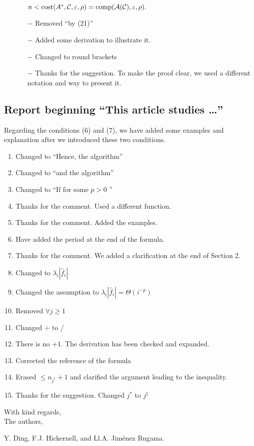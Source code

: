 \documentclass[letter]{article}
\begin{document}
\begin{enumerate}[labelwidth = 10ex]
\begin{itemize}
      $n < \textup{cost}(A^*,{\mathcal{C}},\varepsilon,\rho) =  \textup{comp}({\mathcal{A}}({\mathcal{C}}),\varepsilon,\rho).$ 
           \item[$-$] Removed ``by (21)''
           \item[$-$] Added some derivation to illustrate it.
            \item[$-$] Changed to round brackets
            \item[$-$] Thanks for the suggestion. To make the proof clear, we used a different notation and way to present it.
       \end{itemize}
\end{enumerate}

\subsection*{Report beginning  ``This article studies \ldots''}

Regarding the conditions (6) and (7), we have added some examples and explanation after we introduced these two conditions.

\begin{enumerate}
    \item Changed to ``Hence, the algorithm''
    \item Changed to ``and the algorithm''
    \item Changed to ``If for some $p > 0$ ''
    \item Thanks for the comment. Used a different function.
    \item Thanks for the comment. Added the examples.
    \item Have added the period at the end of the formula.
    \item Thanks for the comment. We added a clarification at the end of Section 2.
    \item Changed to $\lambda_i |\widehat{f}_i|$
    \item Changed the assumption to 
    $\lambda_i |\widehat{f}_i| =\Theta(i^{-p})$
    \item Removed $\forall j  \ge 1$
    \item Changed $\div$ to $/$
    \item There is no $+1$.  The derivation has been checked and expanded.
    \item Corrected the reference of the formula
    \item Erased $\le n_{j^\dagger}+1$ and clarified the argument leading to the inequality.
    \item Thanks for the suggestion. Changed $j^*$ to $j^{\ddagger}$
\end{enumerate}

\bigskip

\noindent With kind regards,\\[0.25cm]
The authors, 

\noindent Y. Ding, F.J. Hickernell,  and Ll.A. Jim\'{e}nez Rugama.



\end{document}
